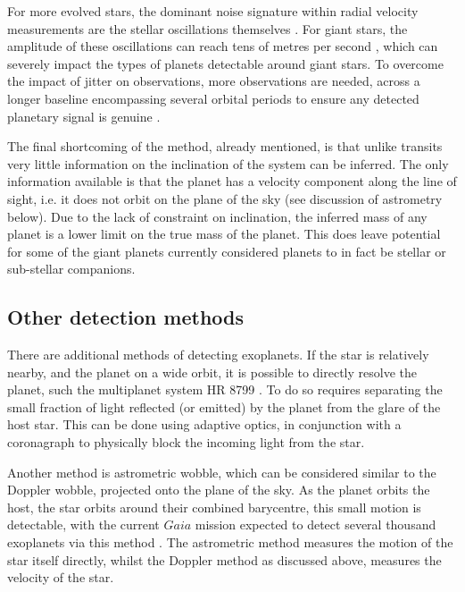 For more evolved stars, the dominant noise signature within radial velocity measurements are the stellar oscillations themselves \citep{2007Udry,2008OToole}. For giant stars, the amplitude of these oscillations can reach tens of metres per second \citep{Bedding95}, which can severely impact the types of planets detectable around giant stars. To overcome the impact of jitter on observations, more observations are needed, across a longer baseline encompassing several orbital periods to ensure any detected planetary signal is genuine \citep{Reffert2014}. 


The final shortcoming of the method, already mentioned, is that unlike transits very little information on the inclination of the system can be inferred. The only information available is that the planet has a velocity component along the line of sight, i.e. it does not orbit on the plane of the sky (see discussion of astrometry below). Due to the lack of constraint on inclination, the inferred mass of any planet is a lower limit on the true mass of the planet. This does leave potential for some of the giant planets currently considered planets to in fact be stellar or sub-stellar companions. 

\subsection{Other detection methods}
There are additional methods of detecting exoplanets. If the star is relatively nearby, and the planet on a wide orbit, it is possible to directly resolve the planet, such the multiplanet system HR 8799 \citep{2008Marois,2010Marois}. To do so requires separating the small fraction of light reflected (or emitted) by the planet from the glare of the host star. This can be done using adaptive optics, in conjunction with a coronagraph to physically block the incoming light from the star. 

Another method is astrometric wobble, which can be considered similar to the Doppler wobble, projected onto the plane of the sky. As the planet orbits the host, the star orbits around their combined barycentre, this small motion is detectable, with the current $Gaia$ mission expected to detect several thousand exoplanets via this method \citep{2014Perryman}. The astrometric method measures the motion of the star itself directly, whilst the Doppler method as discussed above, measures the velocity of the star.

